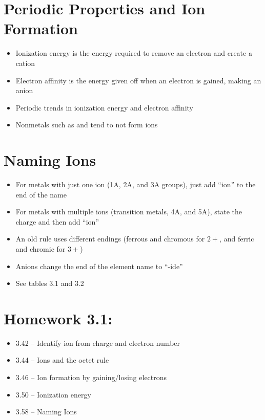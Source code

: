\documentclass[12pt, openany, letterpaper]{memoir}
\begin{document}
\section{Periodic Properties and Ion Formation}
\begin{itemize}
	\item Ionization energy is the energy required to remove an electron and create a cation
	\item Electron affinity is the energy given off when an electron is gained, making an anion
	\item Periodic trends in ionization energy and electron affinity
	\item Nonmetals such as  and  tend to not form ions
\end{itemize}

\section{Naming Ions}
\begin{itemize}
	\item For metals with just one ion (1A, 2A, and 3A groups), just add ``ion'' to the end of the name
	\item For metals with multiple ions (transition metals, 4A, and 5A), state the charge and then add ``ion''
	\item An old rule uses different endings (ferrous and chromous for $2+$, and ferric and chromic for $3+$)
	\item Anions change the end of the element name to ``-ide''
	\item See tables 3.1 and 3.2
\end{itemize}

\section*{Homework 3.1:}
\begin{itemize}
	\item 3.42 -- Identify ion from charge and electron number
	\item 3.44 -- Ions and the octet rule
	\item 3.46 -- Ion formation by gaining/losing electrons
	\item 3.50 -- Ionization energy
	\item 3.58 -- Naming Ions
\end{itemize}
\end{document}
